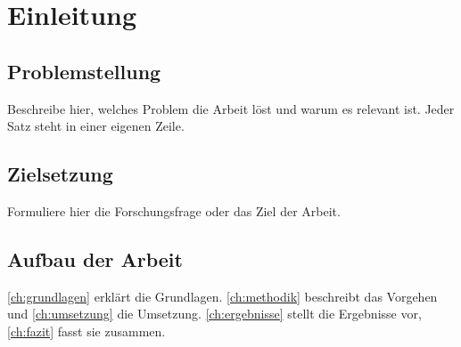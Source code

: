 
\chapter{Einleitung}\label{ch:einleitung}

\section{Problemstellung}\label{sec:problemstellung}

Beschreibe hier, welches Problem die Arbeit löst und warum es relevant ist.
Jeder Satz steht in einer eigenen Zeile.

\section{Zielsetzung}\label{sec:zielsetzung}

Formuliere hier die Forschungsfrage oder das Ziel der Arbeit.

\section{Aufbau der Arbeit}\label{sec:aufbau}

\autoref{ch:grundlagen} erklärt die Grundlagen.
\autoref{ch:methodik} beschreibt das Vorgehen und \autoref{ch:umsetzung} die Umsetzung.
\autoref{ch:ergebnisse} stellt die Ergebnisse vor, \autoref{ch:fazit} fasst sie zusammen.
